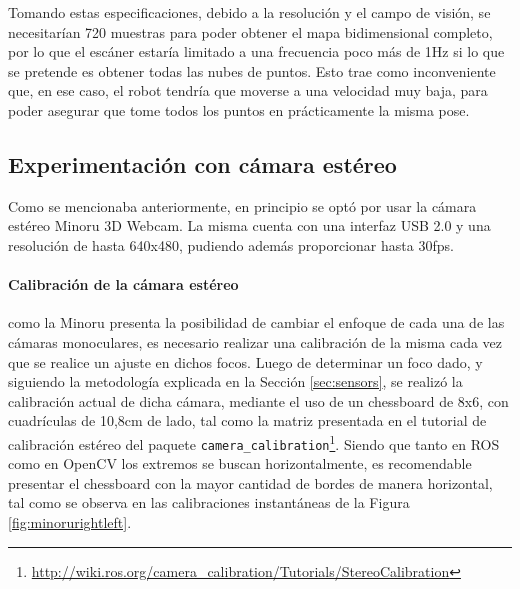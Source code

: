 Tomando estas especificaciones, debido a la resolución y el campo de visión, se necesitarían 720 muestras para poder obtener el mapa bidimensional completo, por lo que el escáner estaría limitado a una frecuencia poco más de 1Hz si lo que se pretende es obtener todas las nubes de puntos. Esto trae como inconveniente que, en ese caso, el robot tendría que moverse a una velocidad muy baja, para poder asegurar que tome todos los puntos en prácticamente la misma pose.

\subsection{Experimentación con cámara estéreo}
Como se mencionaba anteriormente, en principio se optó por usar la cámara estéreo Minoru 3D Webcam. La misma cuenta con una interfaz USB 2.0 y una resolución de hasta 640x480, pudiendo además proporcionar hasta 30fps.

\paragraph{Calibración de la cámara estéreo}
como la Minoru presenta la posibilidad de cambiar el enfoque de cada una de las cámaras monoculares, es necesario realizar una calibración de la misma cada vez que se realice un ajuste en dichos focos. Luego de determinar un foco dado, y siguiendo la metodología explicada en la Sección \ref{sec:sensors}, se realizó la calibración actual de dicha cámara, mediante el uso de un chessboard de 8x6, con cuadrículas de 10,8cm de lado, tal como la matriz presentada en el tutorial de calibración estéreo del paquete \texttt{camera\_calibration}\footnote{\url{http://wiki.ros.org/camera_calibration/Tutorials/StereoCalibration}}. Siendo que tanto en ROS como en OpenCV los extremos se buscan horizontalmente, es recomendable presentar el chessboard con la mayor cantidad de bordes de manera horizontal, tal como se observa en las calibraciones instantáneas de la Figura \ref{fig:minorurightleft}.

